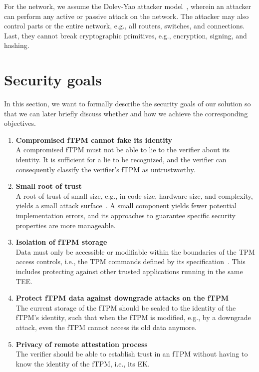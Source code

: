 For the network, we assume the Dolev-Yao attacker model~\cite{Dolev1983}, wherein an attacker can perform any active or passive attack on the network.
The attacker may also control parts or the entire network, e.g., all routers, switches, and connections.
Last, they cannot break cryptographic primitives, e.g., encryption, signing, and hashing.

\section{Security goals}

In this section, we want to formally describe the security goals of our solution so that we can later briefly discuss whether and how we achieve the corresponding objectives.

\begin{enumerate}[label=\textbf{SG-\arabic*}]
  \item{\textbf{Compromised fTPM cannot fake its identity}\\
  A compromised fTPM must not be able to lie to the verifier about its identity.
  It is sufficient for a lie to be recognized, and the verifier can consequently classify the verifier's fTPM as untrustworthy.}\label{sg:1}

  \item{\textbf{Small root of trust}\\
  A root of trust of small size, e.g., in code size, hardware size, and complexity, yields a small attack surface~\cite{Singaravelu2006}.
  A small component yields fewer potential implementation errors, and its approaches to guarantee specific security properties are more manageable.}\label{sg:2}
  
  \item{\textbf{Isolation of fTPM storage}\\
  Data must only be accessible or modifiable within the boundaries of the TPM access controls, i.e., the TPM commands defined by its specification~\cite{tpm20}.
  This includes protecting against other trusted applications running in the same \ac{TEE}\@.}\label{sg:3}
  
  \item{\textbf{Protect fTPM data against downgrade attacks on the fTPM}\\
  The current storage of the fTPM should be sealed to the identity of the fTPM's identity, such that when the fTPM is modified, e.g., by a downgrade attack, even the fTPM cannot access its old data anymore.}\label{sg:4}

  \item{\textbf{Privacy of remote attestation process}\\
  The verifier should be able to establish trust in an fTPM without having to know the identity of the fTPM, i.e., its EK\@.}\label{sg:5}
\end{enumerate}

